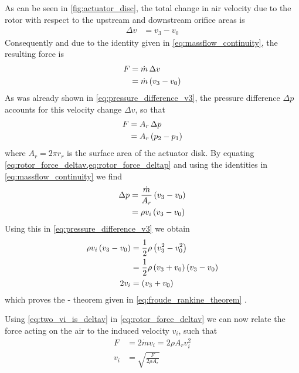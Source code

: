 As can be seen in \cref{fig:actuator_disc}, the total change in air velocity due to the rotor with respect to the upstream and downstream orifice areas is
%
\begin{align}
\Delta v &= v_3 - v_0
\end{align}
%
Consequently and due to the identity given in \cref{eq:massflow_continuity}, the resulting force is
%
\begin{align}
F &= \dot{m} \, \Delta v \\ 
  &= \dot{m} \left( v_3 - v_0 \right) \label{eq:rotor_force_deltav}
\end{align}
%
As was already shown in \cref{eq:pressure_difference_v3}, the pressure difference $\Delta p$ accounts for this velocity change $\Delta v$, so that
%
\begin{align}
F &= A_r \, \Delta p \\
  &= A_r \left( p_2 - p_1 \right) \label{eq:rotor_force_deltap}
\end{align}
%
where $A_r = 2 \pi r_r$ is the surface area of the actuator disk.
By equating \cref{eq:rotor_force_deltav,eq:rotor_force_deltap} and using the identities in \cref{eq:massflow_continuity} we find
%
\begin{align}
 \Delta p &= \frac{\dot{m}}{A_r} \left( v_3 - v_0 \right) \\
                      &= \rho v_i \left( v_3 - v_0 \right)
\end{align}
%
Using this in \cref{eq:pressure_difference_v3} we obtain
%
\begin{align}
\rho v_i \left( v_3 - v_0 \right) &= \frac{1}{2} \rho \left( v^2_3 - v^2_0 \right) \label{eq:froude_rankine_proof} \\
         &= \frac{1}{2} \rho \left( v_3 + v_0 \right) \left( v_3 - v_0 \right) \notag \\
2 v_i &= \left( v_3 + v_0 \right) \label{eq:two_vi_is_deltav}
\end{align}
%
which proves the - theorem given in \cref{eq:froude_rankine_theorem} .

Using \cref{eq:two_vi_is_deltav} in \cref{eq:rotor_force_deltav} we can now relate the force acting on the air to the induced velocity $v_i$, such that
%
\begin{align}
F &= 2 \dot{m} v_i = 2 \rho A_r v^2_i \label{eq:thrust_mdot} \\
v_i &= \sqrt{\frac{F}{2 \rho A_r}}
\end{align}

